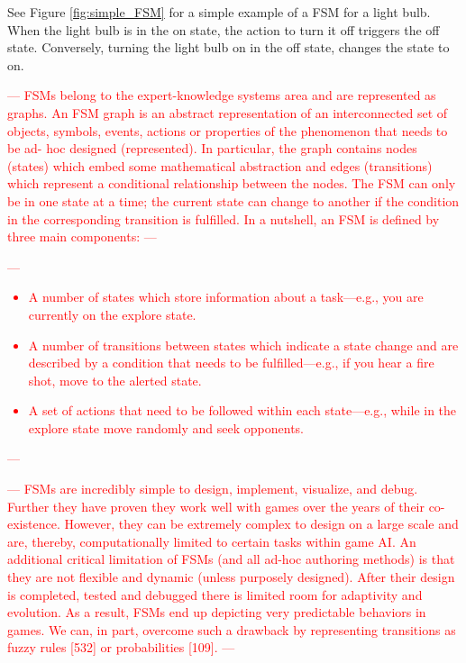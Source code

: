 See Figure \ref{fig:simple_FSM} for a simple example of a FSM for a light bulb. 
When the light bulb is in the on state, the action to turn it off triggers the off state.
Conversely, turning the light bulb on in the off state, changes the state to on.



\textcolor{red}{---
FSMs belong to the expert-knowledge systems area and are represented as graphs. 
An FSM graph is an abstract representation of an interconnected set of objects, symbols, events, actions or properties of the phenomenon that needs to be ad- hoc designed (represented). 
In particular, the graph contains nodes (states) which embed some mathematical abstraction and edges (transitions) which represent a conditional relationship between the nodes. 
The FSM can only be in one state at a time; the current state can change to another if the condition in the corresponding transition is fulfilled. 
In a nutshell, an FSM is defined by three main components:
---}

\textcolor{red}{---
\begin{itemize}
    \item A number of states which store information about a task—e.g., you are currently on the explore state.
    \item A number of transitions between states which indicate a state change and are described by a condition that needs to be fulfilled—e.g., if you hear a fire shot, move to the alerted state.
    \item A set of actions that need to be followed within each state—e.g., while in the explore state move randomly and seek opponents.
\end{itemize}
---}

\textcolor{red}{---
FSMs are incredibly simple to design, implement, visualize, and debug. Further they have proven they work well with games over the years of their co-existence. 
However, they can be extremely complex to design on a large scale and are, thereby, computationally limited to certain tasks within game AI. 
An additional critical limitation of FSMs (and all ad-hoc authoring methods) is that they are not flexible and dynamic (unless purposely designed). 
After their design is completed, tested and debugged there is limited room for adaptivity and evolution. 
As a result, FSMs end up depicting very predictable behaviors in games. 
We can, in part, overcome such a drawback by representing transitions as fuzzy rules [532] or probabilities [109].
---}


